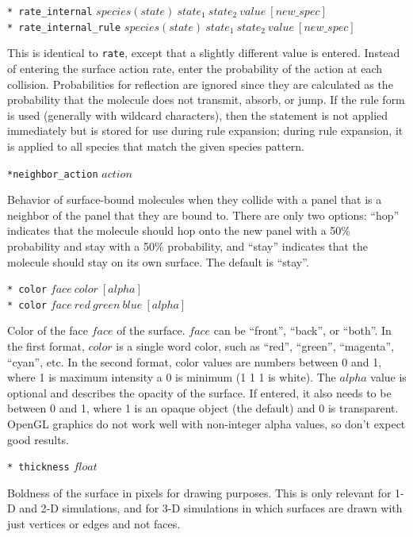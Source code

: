 \documentclass {scrbook}
\newcommand {\ttt} {\texttt}
\begin{document}
\begin{description}
\item{\ttt{* rate\_internal} $species(state)\ state_1\ state_2\ value\ [new\_spec]$\\
\ttt{* rate\_internal\_rule} $species(state)\ state_1\ state_2\ value\ [new\_spec]$}

This is identical to \ttt{rate}, except that a slightly different value is entered. Instead of entering the surface action rate, enter the probability of the action at each collision. Probabilities for reflection are ignored since they are calculated as the probability that the molecule does not transmit, absorb, or jump. If the rule form is used (generally with wildcard characters), then the statement is not applied immediately but is stored for use during rule expansion; during rule expansion, it is applied to all species that match the given species pattern.

\item{\ttt{*neighbor\_action} $action$}

Behavior of surface-bound molecules when they collide with a panel that is a neighbor of the panel that they are bound to. There are only two options: ``hop'' indicates that the molecule should hop onto the new panel with a 50\% probability and stay with a 50\% probability, and ``stay'' indicates that the molecule should stay on its own surface. The default is ``stay''.

\item{\ttt{* color} $face\ color\ [alpha]$\\
\ttt{* color} $face\ red\ green\ blue\ [alpha]$}

Color of the face $face$ of the surface. $face$ can be ``front'', ``back'', or ``both''. In the first format, $color$ is a single word color, such as ``red'', ``green'', ``magenta'', ``cyan'', etc. In the second format, color values are numbers between 0 and 1, where 1 is maximum intensity a 0 is minimum (1 1 1 is white). The $alpha$ value is optional and describes the opacity of the surface. If entered, it also needs to be between 0 and 1, where 1 is an opaque object (the default) and 0 is transparent. OpenGL graphics do not work well with non-integer alpha values, so don't expect good results.

\item{\ttt{* thickness} $float$}

Boldness of the surface in pixels for drawing purposes. This is only relevant for 1-D and 2-D simulations, and for 3-D simulations in which surfaces are drawn with just vertices or edges and not faces.


\end{description}
\end{document}
